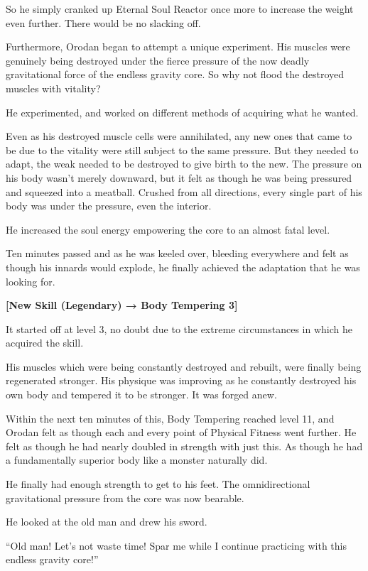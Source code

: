 \documentclass[a4paper,10pt]{book}
\begin{document}
So he simply cranked up Eternal Soul Reactor once more to increase the weight even further. There would be no slacking off.\par
Furthermore, Orodan began to attempt a unique experiment. His muscles were genuinely being destroyed under the fierce pressure of the now deadly gravitational force of the endless gravity core. So why not flood the destroyed muscles with vitality?\par
He experimented, and worked on different methods of acquiring what he wanted.\par
Even as his destroyed muscle cells were annihilated, any new ones that came to be due to the vitality were still subject to the same pressure. But they needed to adapt, the weak needed to be destroyed to give birth to the new. The pressure on his body wasn’t merely downward, but it felt as though he was being pressured and squeezed into a meatball. Crushed from all directions, every single part of his body was under the pressure, even the interior.\par
He increased the soul energy empowering the core to an almost fatal level.\par
Ten minutes passed and as he was keeled over, bleeding everywhere and felt as though his innards would explode, he finally achieved the adaptation that he was looking for.\par
\textbf{[New Skill (Legendary) → Body Tempering 3]}\par
It started off at level 3, no doubt due to the extreme circumstances in which he acquired the skill.\par
His muscles which were being constantly destroyed and rebuilt, were finally being regenerated stronger. His physique was improving as he constantly destroyed his own body and tempered it to be stronger. It was forged anew.\par
Within the next ten minutes of this, Body Tempering reached level 11, and Orodan felt as though each and every point of Physical Fitness went further. He felt as though he had nearly doubled in strength with just this. As though he had a fundamentally superior body like a monster naturally did.\par
He finally had enough strength to get to his feet. The omnidirectional gravitational pressure from the core was now bearable.\par
He looked at the old man and drew his sword.\par
“Old man! Let’s not waste time! Spar me while I continue practicing with this endless gravity core!”\par
\end{document}
